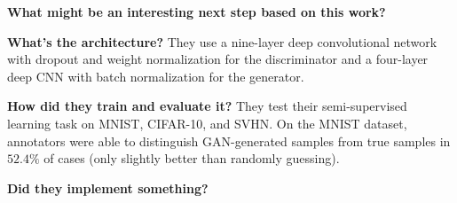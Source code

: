 \noindent\textbf{What might be an interesting next step based on this work?}

\noindent\textbf{What's the architecture?} They use a nine-layer deep
convolutional network with dropout and weight normalization for the
discriminator and a four-layer deep CNN with batch normalization for the
generator.

\noindent\textbf{How did they train and evaluate it?} They test their
semi-supervised learning task on MNIST, CIFAR-10, and SVHN. On the MNIST
dataset, annotators were able to distinguish GAN-generated samples from true
samples in $52.4\%$ of cases (only slightly better than randomly guessing).


\noindent\textbf{Did they implement something?}

